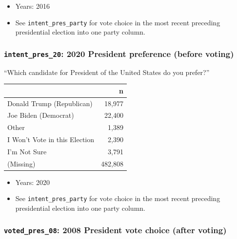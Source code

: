 \documentclass[10pt,article,oneside]{memoir}
\theoremstyle{definition}
\begin{document}
\begin{itemize}
\tightlist
\item
  Years: 2016
\item
  See \texttt{intent\_pres\_party} for vote choice in the most recent
  preceding presidential election into one party column.
\end{itemize}

\hypertarget{intent_pres_20-2020-president-preference-before-voting}{%
\subsubsection{\texorpdfstring{\texttt{intent\_pres\_20}: 2020 President
preference (before
voting)}{intent\_pres\_20: 2020 President preference (before voting)}}\label{intent_pres_20-2020-president-preference-before-voting}}

``Which candidate for President of the United States do you prefer?''

\begin{table}[H]
\centering
\begin{tabular}{lr}
\toprule
 & n\\
\midrule
Donald Trump (Republican) & 18,977\\
Joe Biden (Democrat) & 22,400\\
Other & 1,389\\
I Won't Vote in this Election & 2,390\\
I'm Not Sure & 3,791\\
(Missing) & 482,808\\
\bottomrule
\end{tabular}
\end{table}

\begin{itemize}
\tightlist
\item
  Years: 2020
\item
  See \texttt{intent\_pres\_party} for vote choice in the most recent
  preceding presidential election into one party column.
\end{itemize}

\hypertarget{voted_pres_08-2008-president-vote-choice-after-voting}{%
\subsubsection{\texorpdfstring{\texttt{voted\_pres\_08}: 2008 President
vote choice (after
voting)}{voted\_pres\_08: 2008 President vote choice (after voting)}}\label{voted_pres_08-2008-president-vote-choice-after-voting}}
\end{document}
